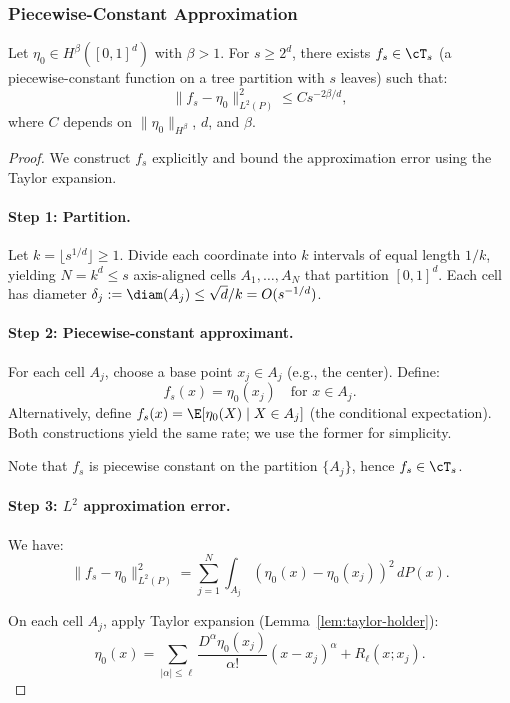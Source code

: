 \subsubsection{Piecewise-Constant Approximation}

\begin{theorem}
\label{thm:approx-beta-gt-1}
Let $\eta_0 \in H^\beta([0,1]^d)$ with $\beta > 1$. For $s \ge 2^d$, there exists $f_s \in \cT_s$ (a piecewise-constant function on a tree partition with $s$ leaves) such that:
\[
\|f_s - \eta_0\|_{L^2(P)}^2 \le C s^{-2\beta/d},
\]
where $C$ depends on $\|\eta_0\|_{H^\beta}$, $d$, and $\beta$.
\end{theorem}

\begin{proof}
We construct $f_s$ explicitly and bound the approximation error using the Taylor expansion.

\paragraph{Step 1: Partition.}
Let $k = \lfloor s^{1/d} \rfloor \ge 1$. Divide each coordinate into $k$ intervals of equal length $1/k$, yielding $N = k^d \le s$ axis-aligned cells $A_1, \ldots, A_N$ that partition $[0,1]^d$. Each cell has diameter $\delta_j := \diam(A_j) \le \sqrt{d}/k = O(s^{-1/d})$.

\paragraph{Step 2: Piecewise-constant approximant.}
For each cell $A_j$, choose a base point $x_j \in A_j$ (e.g., the center). Define:
\[
f_s(x) = \eta_0(x_j) \quad \text{for } x \in A_j.
\]
Alternatively, define $f_s(x) = \E[\eta_0(X) \mid X \in A_j]$ (the conditional expectation). Both constructions yield the same rate; we use the former for simplicity.

Note that $f_s$ is piecewise constant on the partition $\{A_j\}$, hence $f_s \in \cT_s$.

\paragraph{Step 3: $L^2$ approximation error.}
We have:
\[
\|f_s - \eta_0\|_{L^2(P)}^2 = \sum_{j=1}^N \int_{A_j} (\eta_0(x) - \eta_0(x_j))^2 \, dP(x).
\]

On each cell $A_j$, apply Taylor expansion (Lemma~\ref{lem:taylor-holder}):
\[
\eta_0(x) = \sum_{|\alpha| \le \ell} \frac{D^\alpha \eta_0(x_j)}{\alpha!} (x - x_j)^\alpha + R_\ell(x; x_j).
\]


\end{proof}
